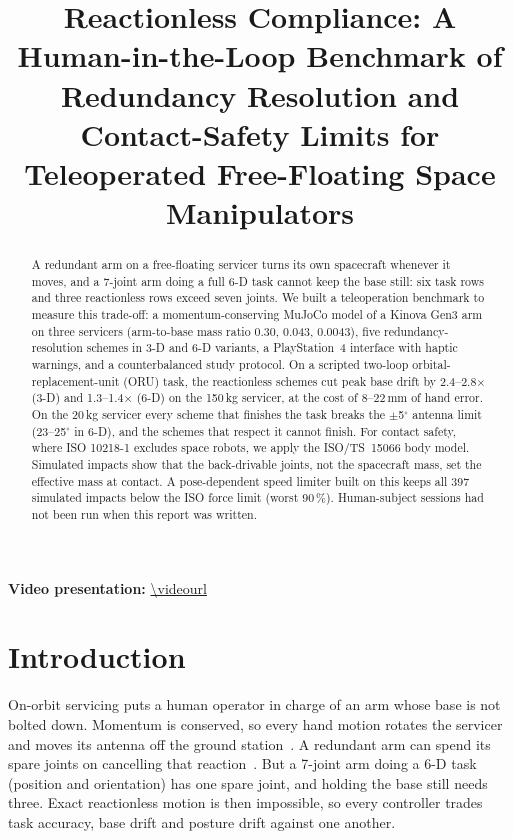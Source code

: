 \documentclass[conference]{IEEEtran}
\begin{document}
\title{Reactionless Compliance: A Human-in-the-Loop Benchmark of Redundancy Resolution and Contact-Safety
Limits for Teleoperated Free-Floating Space Manipulators}
\author{\authorblock}
\maketitle

\begin{abstract}
A redundant arm on a free-floating servicer turns its own spacecraft whenever it moves, and a 7-joint arm
doing a full 6-D task cannot keep the base still: six task rows and three reactionless rows exceed seven
joints. We built a teleoperation benchmark to measure this trade-off: a momentum-conserving MuJoCo model of
a Kinova Gen3 arm on three servicers (arm-to-base mass ratio 0.30, 0.043, 0.0043), five
redundancy-resolution schemes in 3-D and 6-D variants, a PlayStation~4 interface with haptic warnings, and a
counterbalanced study protocol. On a scripted two-loop orbital-replacement-unit (ORU) task, the reactionless
schemes cut peak base drift by 2.4--2.8$\times$ (3-D) and 1.3--1.4$\times$ (6-D) on the 150\,kg servicer, at the cost of
8--22\,mm of hand error. On the 20\,kg servicer every scheme that finishes the task breaks the
$\pm$5$^\circ$ antenna limit (23--25$^\circ$ in 6-D), and the schemes that respect it cannot finish. For contact safety,
where ISO 10218-1 excludes space robots, we apply the ISO/TS~15066 body model. Simulated impacts show that
the back-drivable joints, not the spacecraft mass, set the effective mass at contact. A pose-dependent
speed limiter built on this keeps all 397 simulated impacts below the ISO force limit (worst 90\,\%).
Human-subject sessions had not been run when this report was written.
\end{abstract}

\noindent\textbf{Video presentation:} \url{\videourl}

\section{Introduction}
On-orbit servicing puts a human operator in charge of an arm whose base is not bolted down. Momentum is
conserved, so every hand motion rotates the servicer and moves its antenna off the ground
station~\cite{dubowsky1993,umetani1989}. A redundant arm can spend its spare joints on cancelling that
reaction~\cite{nenchev1999rns,yoshida2001}. But a 7-joint arm doing a 6-D task (position and orientation)
has one spare joint, and holding the base still needs three. Exact reactionless motion is then impossible,
so every controller trades task accuracy, base drift and posture drift against one another.
\end{document}
